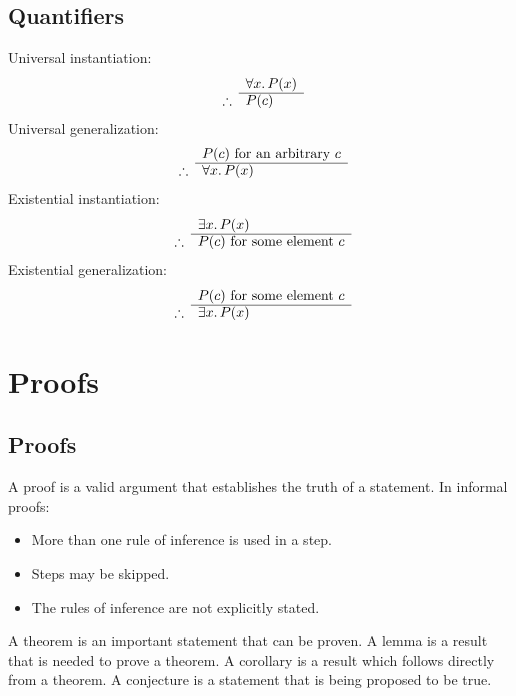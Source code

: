 \subsection{Quantifiers}
Universal instantiation:
\begin{equation}
    \begin{array}{r l}
                   & \forall x\ldotp P(x) \\
        \cline{2-2}
        \therefore & P(c)
    \end{array}
\end{equation}
Universal generalization:
\begin{equation}
    \begin{array}{r l}
                   & P(c) \text{ for an arbitrary } c \\
        \cline{2-2}
        \therefore & \forall x\ldotp P(x)
    \end{array}
\end{equation}
Existential instantiation:
\begin{equation}
    \begin{array}{r l}
                   & \exists x\ldotp P(x)             \\
        \cline{2-2}
        \therefore & P(c) \text{ for some element } c
    \end{array}
\end{equation}
Existential generalization:
\begin{equation}
    \begin{array}{r l}
                   & P(c) \text{ for some element } c \\
        \cline{2-2}
        \therefore & \exists x\ldotp P(x)
    \end{array}
\end{equation}

\section{Proofs}
\subsection{Proofs}
A proof is a valid argument that establishes the truth of a statement. In informal proofs:
\begin{itemize}
    \item More than one rule of inference is used in a step.
    \item Steps may be skipped.
    \item The rules of inference are not explicitly stated.
\end{itemize}
A theorem is an important statement that can be proven. A lemma is a result that is needed to prove a theorem. A corollary is a result which follows directly from a theorem. A conjecture is a statement that is being proposed to be true.

